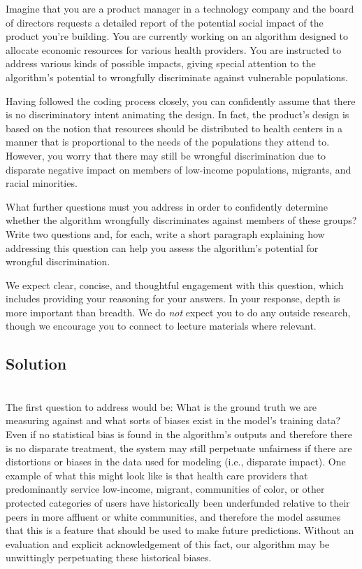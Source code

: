 \documentclass[submit]{harvardml}
\begin{document}
\newpage
\begin{problem}
Imagine that you are a product manager in a technology company and the board of directors requests a detailed report of the potential social impact of the product you're building. You are currently working on an algorithm designed to allocate economic resources for various health providers. You are instructed to address various kinds of possible impacts, giving special attention to the algorithm’s potential to wrongfully discriminate against vulnerable populations. 

Having followed the coding process closely, you can confidently assume that there is no discriminatory intent animating the design.  In fact, the product’s design is based on the notion that resources should be distributed to health centers in a manner that is proportional to the needs of the populations they attend to. However, you worry that there may still be wrongful discrimination due to disparate negative impact on members of low-income populations, migrants, and racial minorities. 

What further questions must you address in order to confidently determine whether the algorithm wrongfully discriminates against members of these groups? Write two questions and, for each, write a short paragraph explaining how addressing this question can help you assess the algorithm’s potential for wrongful discrimination.


We expect clear, concise, and thoughtful engagement with this question, which includes providing your reasoning for your answers.  In your response, depth is more important than breadth. We do \emph{not} expect you to do any outside research, though we encourage you to connect to lecture materials where relevant.

\end{problem}

\subsection*{Solution}
\\
The first question to address would be: What is the ground truth we are measuring against and what sorts of biases exist in the model's training data? \\

Even if no statistical bias is found in the algorithm's outputs and therefore there is no disparate treatment, the system may still perpetuate unfairness if there are distortions or biases in the data used for modeling (i.e., disparate impact). One example of what this might look like is that health care providers that predominantly service low-income, migrant, communities of color, or other protected categories of users have historically been underfunded relative to their peers in more affluent or white communities, and therefore the model assumes that this is a feature that should be used to make future predictions. Without an evaluation and explicit acknowledgement of this fact, our algorithm may be unwittingly perpetuating these historical biases. \\
\end{document}
